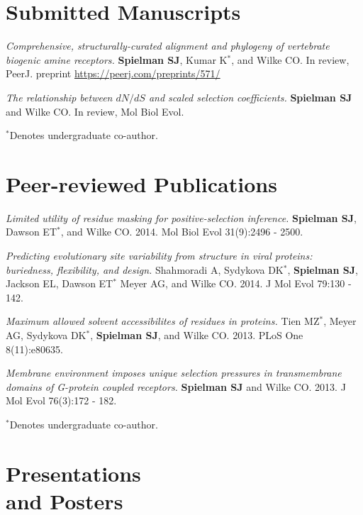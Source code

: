 \documentclass[line, margin]{res}
\begin{document}
\begin{resume}
\vspace{0.75cm}
		

\section{Submitted Manuscripts}

\emph{Comprehensive, structurally-curated alignment and phylogeny of vertebrate biogenic amine receptors.} \textbf{Spielman SJ}, Kumar K$^\ast$, and Wilke CO. In review, PeerJ. preprint \url{https://peerj.com/preprints/571/}


\emph{The relationship between $dN/dS$ and scaled selection coefficients.} \textbf{Spielman SJ} and Wilke CO. In review, Mol Biol Evol.

$^\ast$Denotes undergraduate co-author.

\vspace{0.75cm}

\section{Peer-reviewed Publications}

\emph{Limited utility of residue masking for positive-selection inference.} \textbf{Spielman SJ}, Dawson ET$^\ast$, and Wilke CO. 2014. Mol Biol Evol 31(9):2496 - 2500.

\emph{Predicting evolutionary site variability from structure in viral proteins: buriedness, flexibility, and design.} Shahmoradi A, Sydykova DK$^\ast$, \textbf{Spielman SJ}, Jackson EL, Dawson ET$^\ast$ Meyer AG, and Wilke CO. 2014. J Mol Evol 79:130 - 142.

\emph{Maximum allowed solvent accessibilites of residues in proteins.} Tien MZ$^\ast$, Meyer AG, Sydykova DK$^\ast$, \textbf{Spielman SJ}, and Wilke CO. 2013. PLoS One 8(11):e80635.

\emph{Membrane environment imposes unique selection pressures in transmembrane domains of G-protein coupled receptors.} \textbf{Spielman SJ} and Wilke CO. 2013. J Mol Evol 76(3):172 - 182.


$^\ast$Denotes undergraduate co-author.

\vspace{0.75cm}


\section{Presentations \\ and Posters}


\end{resume}
\end{document}
